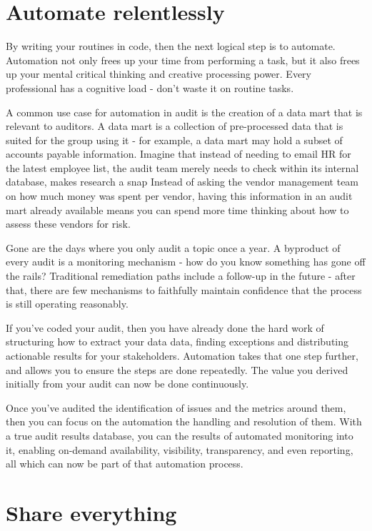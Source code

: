\documentclass[
]{book}
\begin{document}
\hypertarget{automate-relentlessly}{%
\section{Automate relentlessly}\label{automate-relentlessly}}

By writing your routines in code, then the next logical step is to automate. Automation not only frees up your time from performing a task, but it also frees up your mental critical thinking and creative processing power. Every professional has a cognitive load - don't waste it on routine tasks.

A common use case for automation in audit is the creation of a data mart that is relevant to auditors. A data mart is a collection of pre-processed data that is suited for the group using it - for example, a data mart may hold a subset of accounts payable information. Imagine that instead of needing to email HR for the latest employee list, the audit team merely needs to check within its internal database, makes research a snap Instead of asking the vendor management team on how much money was spent per vendor, having this information in an audit mart already available means you can spend more time thinking about how to assess these vendors for risk.

Gone are the days where you only audit a topic once a year. A byproduct of every audit is a monitoring mechanism - how do you know something has gone off the rails? Traditional remediation paths include a follow-up in the future - after that, there are few mechanisms to faithfully maintain confidence that the process is still operating reasonably.

If you've coded your audit, then you have already done the hard work of structuring how to extract your data data, finding exceptions and distributing actionable results for your stakeholders. Automation takes that one step further, and allows you to ensure the steps are done repeatedly. The value you derived initially from your audit can now be done continuously.

Once you've audited the identification of issues and the metrics around them, then you can focus on the automation the handling and resolution of them. With a true audit results database, you can the results of automated monitoring into it, enabling on-demand availability, visibility, transparency, and even reporting, all which can now be part of that automation process.

\hypertarget{share-everything}{%
\section{Share everything}\label{share-everything}}
\end{document}
